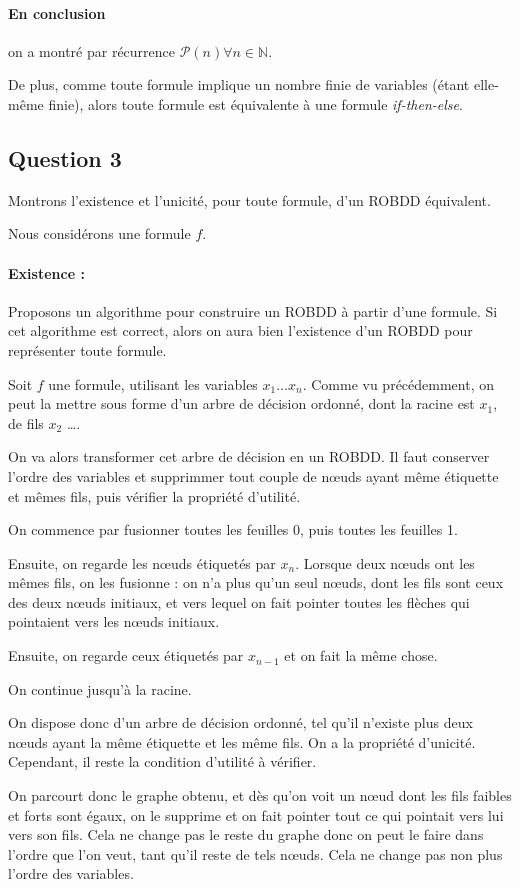 \documentclass[12pt]{article}
\def\question#1{\subsection*{Question #1}}
\def\ite{\textit{if-then-else}}
\def\P{\mathcal{P}}
\begin{document}
\paragraph{En conclusion} on a montré par récurrence $\P (n)\forall n\in\mathbb{N}$.

De plus, comme toute formule implique un nombre finie de variables (étant elle-même finie), alors toute formule est équivalente à une formule \ite.

\question{3}
Montrons l'existence et l'unicité, pour toute formule, d'un ROBDD équivalent.

Nous considérons une formule $f$.
\paragraph{Existence :}
Proposons un algorithme pour construire un ROBDD à partir d'une formule. Si cet algorithme est correct, alors on aura bien l'existence d'un ROBDD pour représenter toute formule.

Soit $f$ une formule, utilisant les variables $x_1\dots x_n$. Comme vu précédemment, on peut la mettre sous forme d'un arbre de décision ordonné, dont la racine est $x_1$, de fils $x_2$ \dots. 

On va alors transformer cet arbre de décision en un ROBDD. Il faut conserver l'ordre des variables et supprimmer tout couple de n\oe uds ayant même étiquette et mêmes fils, puis vérifier la propriété d'utilité.

On commence par fusionner toutes les feuilles 0, puis toutes les feuilles 1.

Ensuite, on regarde les n\oe uds étiquetés par $x_n$. Lorsque deux n\oe uds ont les mêmes fils, on les fusionne : on n'a plus qu'un seul n\oe uds, dont les fils sont ceux des deux n\oe uds initiaux, et vers lequel on fait pointer toutes les flèches qui pointaient vers les n\oe uds initiaux.

Ensuite, on regarde ceux étiquetés par $x_{n-1}$ et on fait la même chose.

On continue jusqu'à la racine.

On dispose donc d'un arbre de décision ordonné, tel qu'il n'existe plus deux n\oe uds ayant la même étiquette et les même fils. On a la propriété d'unicité. Cependant, il reste la condition d'utilité à vérifier.

On parcourt donc le graphe obtenu, et dès qu'on voit un n\oe ud dont les fils faibles et forts sont égaux, on le supprime et on fait pointer tout ce qui pointait vers lui vers son fils. Cela ne change pas le reste du graphe donc on peut le faire dans l'ordre que l'on veut, tant qu'il reste de tels n\oe uds. Cela ne change pas non plus l'ordre des variables.
\end{document}
